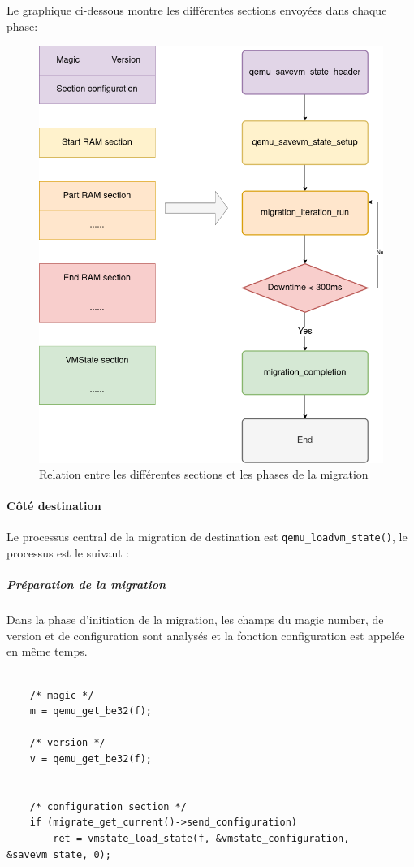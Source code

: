 Le graphique ci-dessous montre les différentes sections envoyées dans chaque phase:
\begin{figure}[H]
    \centering
    \includegraphics[scale=0.4]{include/summerize.png}
    \caption{Relation entre les différentes sections et les phases de la migration}
\end{figure}

\paragraph*{Côté destination}

Le processus central de la migration de destination est \texttt{qemu\_loadvm\_state()}, le processus est le suivant : 

\subparagraph*{Préparation de la migration}
Dans la phase d'initiation de la migration, les champs du magic number, de version et de configuration sont analysés et la fonction configuration est appelée en même temps. 
\begin{lstlisting}[caption={Code responsable de la phase de préparation},captionpos=b]

    /* magic */
    m = qemu_get_be32(f);

    /* version */
    v = qemu_get_be32(f);


    /* configuration section */
    if (migrate_get_current()->send_configuration)
        ret = vmstate_load_state(f, &vmstate_configuration, &savevm_state, 0);

\end{lstlisting}

